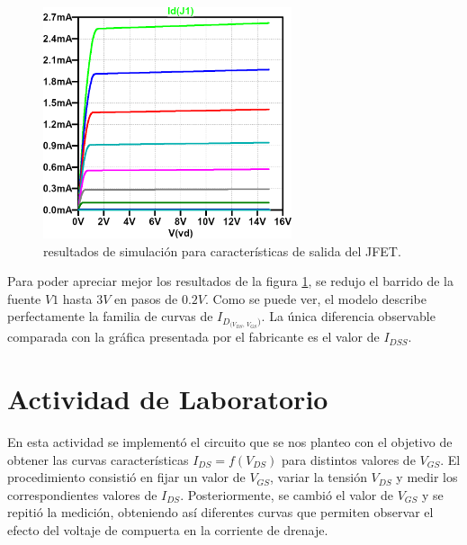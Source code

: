     \begin{figure}[!ht]
      \centering
      \includegraphics[width=0.65\textwidth]{images/salida-id_vds-vgs.png}
      \caption{resultados de simulación para características de salida del JFET.}
      \label{fig:sim.sal}
    \end{figure}

    Para poder apreciar mejor los resultados de la figura \ref{fig:sim.sal}, se redujo el barrido de la fuente $V1$
    hasta $3V$ en pasos de $0.2V$. Como se puede ver, el modelo describe perfectamente la familia de curvas de
    $I_{D_{(V_{DS}, \, V_{GS}})}$. La única diferencia observable comparada con la gráfica presentada por el fabricante es el
    valor de $I_{DSS}$.

\section{Actividad de Laboratorio}

    En esta actividad se implementó el circuito que se nos planteo con el objetivo de obtener las curvas características
    $I_{DS} = f(V_{DS})$ para distintos valores de $V_{GS}$.  El procedimiento consistió en fijar un valor de $V_{GS}$,
    variar la tensión $V_{DS}$ y medir los correspondientes valores de $I_{DS}$. Posteriormente, se cambió el valor de
    $V_{GS}$ y se repitió la medición, obteniendo así diferentes curvas que permiten observar el efecto del voltaje de
    compuerta en la corriente de drenaje.  
    
